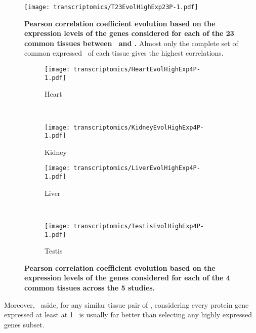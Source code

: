 \begin{figure}[!htpb]
    \texttt{[image: transcriptomics/T23EvolHighExp23P-1.pdf]}\centering
    \caption[Pearson correlation coefficient evolution based on the expression
    levels of the genes considered for each of the 23 common tissues]{%
\label{fig:CorHighExp23T}\textbf{Pearson correlation coefficient evolution based
on the expression levels of the genes considered
for each of the 23 common tissues between \uhlen\ and \gtex.}
Almost only the complete set of common expressed \pcgs\ of each tissue gives
the highest correlations.}
\end{figure}

\begin{sidewaysfigure}[htpb]
    \centering
    \begin{subfigure}[b]{0.50\textwidth}\centering
        \texttt{[image: transcriptomics/HeartEvolHighExp4P-1.pdf]}
        \caption{Heart}\label{fig:CorHighExpHeart4T}
    \end{subfigure}%
~%
    \begin{subfigure}[b]{0.50\textwidth}\centering
        \texttt{[image: transcriptomics/KidneyEvolHighExp4P-1.pdf]}
        \caption{Kidney}\label{fig:CorHighExpKidney4T}
    \end{subfigure}

    \begin{subfigure}[b]{0.50\textwidth}\centering
        \texttt{[image: transcriptomics/LiverEvolHighExp4P-1.pdf]}
        \caption{Liver}\label{fig:CorHighExpLiver4T}
    \end{subfigure}%
~%
    \begin{subfigure}[b]{0.50\textwidth}\centering
        \texttt{[image: transcriptomics/TestisEvolHighExp4P-1.pdf]}
        \caption{Testis}\label{fig:CorHighExpTestis4T}
    \end{subfigure}
    \caption[Pearson correlation coefficient evolution based on the expression
    levels of the genes considered for each of the 4 common tissues]{%
\label{fig:CorHighExp4T}\textbf{Pearson correlation coefficient evolution
    based on the expression levels of the genes considered for each of the 4
    common tissues across the 5 studies.}}
\end{sidewaysfigure}

Moreover, \kidney\ aside,
for any similar tissue pair of \setTwo,
considering every protein gene expressed at least at 1 \FPKM\ is usually
far better than selecting any highly expressed genes subset.


